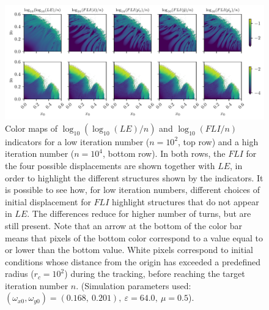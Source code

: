 \begin{figure}[htp]
    \centering
    \includegraphics[width=\textwidth]{6_dynamic_indicators/fig/corrected_figs/LE_FLI_NEO.pdf}
    \caption{Color maps of $\log_{10}(\log_{10}(LE)/n)$ and $\log_{10}(FLI/n)$ indicators for a low iteration number ($n=10^2$, top row) and a high iteration number ($n=10^4$, bottom row). In both rows, the $FLI$ for the four possible displacements are shown together with $LE$, in order to highlight the different structures shown by the indicators. It is possible to see how, for low iteration numbers, different choices of initial displacement for $FLI$ highlight structures that do not appear in $LE$. The differences reduce for higher number of turns, but are still present. Note that an arrow at the bottom of the color bar means that pixels of the bottom color correspond to a value equal to or lower than the bottom value. White pixels correspond to initial conditions whose distance from the origin has exceeded a predefined radius ($r_c=10^2$) during the tracking, before reaching the target iteration number $n$. (Simulation parameters used: $(\omega_{x0},\omega_{y0})= (0.168,\ 0.201),\ \varepsilon=64.0,\ \mu=0.5$).}
    \label{fig:le_fli_compare_short_long}
\end{figure}


